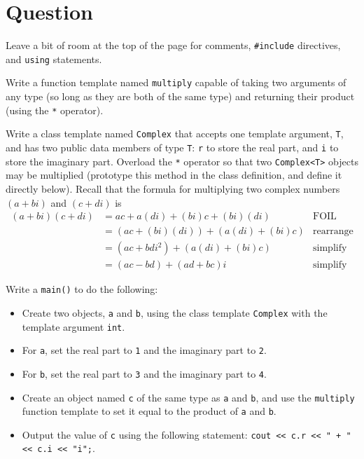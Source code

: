 \newEvenPage

\section{Question}

Leave a bit of room at the top of the page for comments,
\texttt{#include} directives, and \texttt{using} statements.

Write a function template named \texttt{multiply} capable of taking
two arguments of any type (so long as they are both of the same type) and
returning their product (using the \texttt{*} operator).

Write a class template named \texttt{Complex} that accepts one
template argument, \texttt{T}, and has two public data members of type
\texttt{T}: \texttt{r} to store the real part, and
\texttt{i} to store the imaginary part.  Overload the
\texttt{*} operator so that two \texttt{Complex<T>} objects
may be multiplied (prototype this method in the class definition, and define it
directly below).  Recall that the formula for multiplying two complex numbers
$(a+bi)$ and $(c+di)$ is
\begin{align*}
  (a+bi)(c+di) &= ac + a(di) + (bi)c + (bi)(di) & \text{FOIL} \\
               &= (ac + (bi)(di)) + (a(di) + (bi)c) & \text{rearrange}\\
               &= (ac + bdi^2) + (a(di) + (bi)c) & \text{simplify} \\
               &= (ac - bd) + (ad + bc)i & \text{simplify}
\end{align*}

Write a \texttt{main()} to do the following:
\begin{itemize}
  \item Create two objects, \texttt{a} and \texttt{b}, using
    the class template \texttt{Complex} with the template argument
    \texttt{int}.
  \item For \texttt{a}, set the real part to \texttt{1} and
    the imaginary part to \texttt{2}.
  \item For \texttt{b}, set the real part to \texttt{3} and
    the imaginary part to \texttt{4}.
  \item Create an object named \texttt{c} of the same type as
    \texttt{a} and \texttt{b}, and use the
    \texttt{multiply} function template to set it equal to the product
    of \texttt{a} and \texttt{b}.
  \item Output the value of \texttt{c} using the following statement:
    \texttt{cout << c.r << " + " << c.i << "i\n";}.
\end{itemize}

\newOddPage
\textQuestion{\makePageQuadrilleRuled}

\newOddPage
\textQuestion{\makePageQuadrilleRuled}
\textAnswer{~}

\newpage

